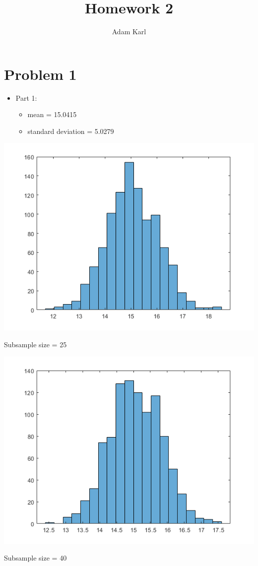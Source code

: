 \documentclass[a4paper]{article}
\title{Homework 2}
\author{Adam Karl}
\begin{document}
\maketitle

\section{Problem 1}
\begin{itemize}
    \item Part 1: 
    \begin{itemize}
        \item mean = 15.0415
        \item standard deviation = 5.0279
    \end{itemize}
\end{itemize}

\begin{center}
    \includegraphics[scale=1]{meansHistogram25.png}
    \caption{Subsample size = 25}
\end{center}
  

\begin{center}
    \includegraphics[scale=1]{meansHistogram40.png}
    \caption{Subsample size = 40}
\end{center}
\end{document}
